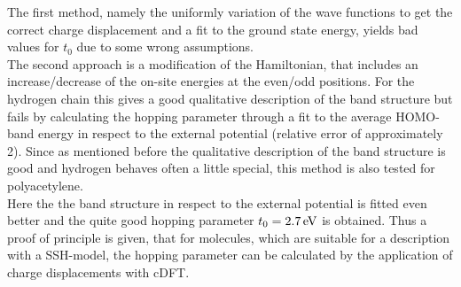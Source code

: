 The first method, namely the uniformly variation of the wave functions to get the correct charge displacement and a fit to the ground state energy, yields bad values for $t_0$ due to some wrong assumptions.\\
The second approach is a modification of the Hamiltonian, that includes an increase/decrease of the on-site energies at the even/odd positions. For the hydrogen chain this gives a good qualitative description of the band structure but fails by calculating the hopping parameter through a fit to the average HOMO-band energy in respect to the external potential (relative error of approximately 2). Since as mentioned before the qualitative description of the band structure is good and hydrogen behaves often a little special, this method is also tested for polyacetylene.\\
Here the the band structure in respect to the external potential is fitted even better and the quite good hopping parameter $t_0 = \unit[2.7]{eV}$ is obtained. Thus a proof of principle is given, that for molecules, which are suitable for a description with a SSH-model, the hopping parameter can be calculated by the application of charge displacements with cDFT.
